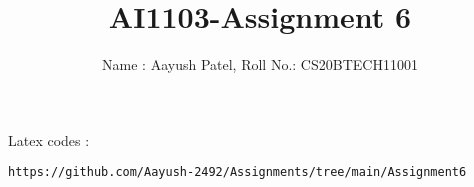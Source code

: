 \documentclass[journal,12pt,twocolumn]{IEEEtran}
\DeclareMathOperator*{\Res}{Res}
\begin{document}
\newcommand{\BEQA}{\begin{eqnarray}}
\newcommand{\EEQA}{\end{eqnarray}}
\newcommand{\define}{\stackrel{\triangle}{=}}

\raggedbottom
\setlength{\parindent}{0pt}
\providecommand{\mbf}{\mathbf}
\providecommand{\pr}[1]{\ensuremath{\Pr\left(#1\right)}}
\providecommand{\qfunc}[1]{\ensuremath{Q\left(#1\right)}}
\providecommand{\sbrak}[1]{\ensuremath{{}\left[#1\right]}}
\providecommand{\lsbrak}[1]{\ensuremath{{}\left[#1\right.}}
\providecommand{\rsbrak}[1]{\ensuremath{{}\left.#1\right]}}
\providecommand{\brak}[1]{\ensuremath{\left(#1\right)}}
\providecommand{\lbrak}[1]{\ensuremath{\left(#1\right.}}
\providecommand{\rbrak}[1]{\ensuremath{\left.#1\right)}}
\providecommand{\cbrak}[1]{\ensuremath{\left\{#1\right\}}}
\providecommand{\lcbrak}[1]{\ensuremath{\left\{#1\right.}}
\providecommand{\rcbrak}[1]{\ensuremath{\left.#1\right\}}}
\theoremstyle{remark}
\newtheorem{rem}{Remark}
\newcommand{\sgn}{\mathop{\mathrm{sgn}}}
\providecommand{\abs}[1]{\vert#1\vert}
\providecommand{\res}[1]{\Res\displaylimits_{#1}} 
\providecommand{\norm}[1]{\lVert#1\rVert}
\providecommand{\mtx}[1]{\mathbf{#1}}
\providecommand{\mean}[1]{E[ #1 ]}
\providecommand{\fourier}{\overset{\mathcal{F}}{ \rightleftharpoons}}
\providecommand{\system}{\overset{\mathcal{H}}{ \longleftrightarrow}}
\newcommand{\solution}{\noindent \textbf{Solution: }}
\newcommand{\cosec}{\,\text{cosec}\,}
\providecommand{\dec}[2]{\ensuremath{\overset{#1}{\underset{#2}{\gtrless}}}}
\newcommand{\myvec}[1]{\ensuremath{\begin{pmatrix}#1\end{pmatrix}}}
\newcommand{\mydet}[1]{\ensuremath{\begin{vmatrix}#1\end{vmatrix}}}
\makeatletter
{}
\makeatother
\let\StandardTheFigure\thefigure
\let\vec\mathbf
\renewcommand{\thefigure}{\theproblem}
\def\putbox#1#2#3{\makebox[0in][l]{\makebox[#1][l]{}\raisebox{\baselineskip}[0in][0in]{\raisebox{#2}[0in][0in]{#3}}}}
     \def\rightbox#1{\makebox[0in][r]{#1}}
     \def\centbox#1{\makebox[0in]{#1}}
     \def\topbox#1{\raisebox{-\baselineskip}[0in][0in]{#1}}
     \def\midbox#1{\raisebox{-0.5\baselineskip}[0in][0in]{#1}}
\vspace{3cm}
\title{AI1103-Assignment 6}
\author{Name : Aayush Patel, Roll No.: CS20BTECH11001}
\maketitle
\newpage
\bigskip
\renewcommand{\thefigure}{\theenumi}
\renewcommand{\thetable}{\theenumi}
%
Latex codes : 
%
\begin{lstlisting}
https://github.com/Aayush-2492/Assignments/tree/main/Assignment6
\end{lstlisting}
\end{document}
